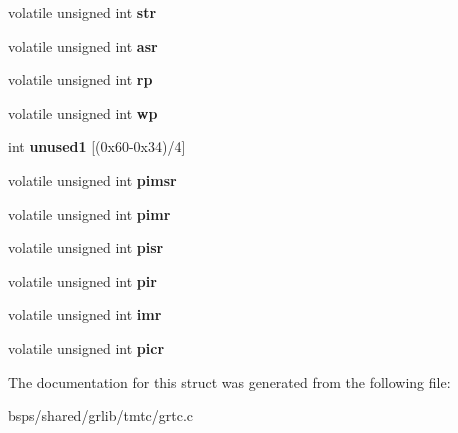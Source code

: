 \begin{DoxyCompactItemize}
volatile unsigned int {\bfseries str}
\item 
\mbox{\label{structgrtc__regs_ab4e45e578383bf45b0d074c22ece0060}} 
volatile unsigned int {\bfseries asr}
\item 
\mbox{\label{structgrtc__regs_a788ad7e6690207babd5c7a15a6d82dd0}} 
volatile unsigned int {\bfseries rp}
\item 
\mbox{\label{structgrtc__regs_a3d88cf37ec6c71a9399cffe9d7ff959a}} 
volatile unsigned int {\bfseries wp}
\item 
\mbox{\label{structgrtc__regs_ae3c6d549f8a0688a6a4b8048073545ed}} 
int {\bfseries unused1} \mbox{[}(0x60-\/0x34)/4\mbox{]}
\item 
\mbox{\label{structgrtc__regs_a6569ac9bc545076cc995ffc72227e4fc}} 
volatile unsigned int {\bfseries pimsr}
\item 
\mbox{\label{structgrtc__regs_a3a5a981f92ec7bc3c44c0a1bd43bf6ae}} 
volatile unsigned int {\bfseries pimr}
\item 
\mbox{\label{structgrtc__regs_aecf41d1a8d9e73983c3176474f9904bc}} 
volatile unsigned int {\bfseries pisr}
\item 
\mbox{\label{structgrtc__regs_a68bf65c987461669063aa2450821fcb0}} 
volatile unsigned int {\bfseries pir}
\item 
\mbox{\label{structgrtc__regs_afdd514ad0345b5f06671b84420e85b8d}} 
volatile unsigned int {\bfseries imr}
\item 
\mbox{\label{structgrtc__regs_afd269d977fdf4d6469b9e60633b13c5a}} 
volatile unsigned int {\bfseries picr}
\end{DoxyCompactItemize}


The documentation for this struct was generated from the following file\+:\begin{DoxyCompactItemize}
\item 
bsps/shared/grlib/tmtc/grtc.\+c\end{DoxyCompactItemize}
